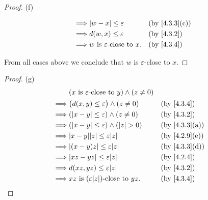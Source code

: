 \begin{proof}{(f)}
\begin{itemize}
\begin{align*}
            \implies & \abs{w - x} \leq \varepsilon                                   &  & \text{(by \cref{4.3.3}(c))} \\
            \implies & d(w, x) \leq \varepsilon                                       &  & \by{4.3.2}                  \\
            \implies & w \text{ is } \varepsilon\text{-close to } x.                  &  & \by{4.3.4}
          \end{align*}
  \end{itemize}
  From all cases above we conclude that \(w\) is \(\varepsilon\)-close to \(x\).
\end{proof}

\begin{proof}{(g)}
  \begin{align*}
             & (x \text{ is } \varepsilon\text{-close to } y) \land (z \neq 0)                                  \\
    \implies & \big(d(x, y) \leq \varepsilon\big) \land (z \neq 0)             &  & \by{4.3.4}                  \\
    \implies & (\abs{x - y} \leq \varepsilon) \land (z \neq 0)                 &  & \by{4.3.2}                  \\
    \implies & (\abs{x - y} \leq \varepsilon) \land (\abs{z} > 0)              &  & \text{(by \cref{4.3.3}(a))} \\
    \implies & \abs{x - y} \abs{z} \leq \varepsilon \abs{z}                    &  & \text{(by \cref{4.2.9}(e))} \\
    \implies & \abs{(x - y)z} \leq \varepsilon \abs{z}                         &  & \text{(by \cref{4.3.3}(d))} \\
    \implies & \abs{xz - yz} \leq \varepsilon \abs{z}                          &  & \by{4.2.4}                  \\
    \implies & d(xz, yz) \leq \varepsilon \abs{z}                              &  & \by{4.3.2}                  \\
    \implies & xz \text{ is } (\varepsilon \abs{z})\text{-close to } yz.       &  & \by{4.3.4}
  \end{align*}
\end{proof}

